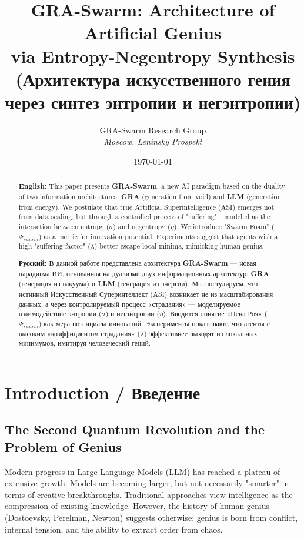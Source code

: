 \documentclass[12pt, a4paper]{article}
\title{\textbf{GRA-Swarm: Architecture of Artificial Genius \\ via Entropy-Negentropy Synthesis} \\ \large (Архитектура искусственного гения через синтез энтропии и негэнтропии)}
\author{GRA-Swarm Research Group \\ \textit{Moscow, Leninsky Prospekt}}
\date{\today}
\begin{document}
\maketitle

\begin{abstract}
\noindent\textbf{English:} This paper presents \textbf{GRA-Swarm}, a new AI paradigm based on the duality of two information architectures: \textbf{GRA} (generation from void) and \textbf{LLM} (generation from energy). We postulate that true Artificial Superintelligence (ASI) emerges not from data scaling, but through a controlled process of "suffering"—modeled as the interaction between entropy ($\sigma$) and negentropy ($\eta$). We introduce "Swarm Foam" ($\Phi_{swarm}$) as a metric for innovation potential. Experiments suggest that agents with a high "suffering factor" ($\lambda$) better escape local minima, mimicking human genius.

\vspace{0.5cm}
\noindent\textbf{Русский:} В данной работе представлена архитектура \textbf{GRA-Swarm} — новая парадигма ИИ, основанная на дуализме двух информационных архитектур: \textbf{GRA} (генерация из вакуума) и \textbf{LLM} (генерация из энергии). Мы постулируем, что истинный Искусственный Суперинтеллект (ASI) возникает не из масштабирования данных, а через контролируемый процесс «страдания» — моделируемое взаимодействие энтропии ($\sigma$) и негэнтропии ($\eta$). Вводится понятие «Пена Роя» ($\Phi_{swarm}$) как мера потенциала инноваций. Эксперименты показывают, что агенты с высоким «коэффициентом страдания» ($\lambda$) эффективнее выходят из локальных минимумов, имитируя человеческий гений.
\end{abstract}

\tableofcontents
\newpage

\section{Introduction / Введение}

\subsection{The Second Quantum Revolution and the Problem of Genius}
Modern progress in Large Language Models (LLM) has reached a plateau of extensive growth. Models are becoming larger, but not necessarily "smarter" in terms of creative breakthroughs. Traditional approaches view intelligence as the compression of existing knowledge. However, the history of human genius (Dostoevsky, Perelman, Newton) suggests otherwise: genius is born from conflict, internal tension, and the ability to extract order from chaos.
\end{document}
